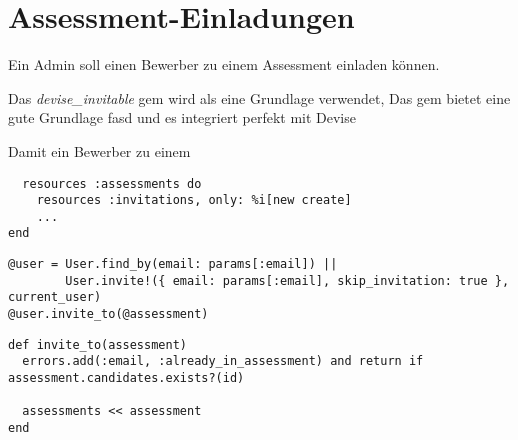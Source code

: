 \section{Assessment-Einladungen}

Ein Admin soll einen Bewerber zu einem Assessment einladen können.



Das \emph{devise\_invitable} gem wird als eine Grundlage verwendet, 
Das gem bietet eine gute Grundlage fasd und es integriert perfekt mit Devise


Damit ein Bewerber zu einem 

\begin{codebox}
\begin{verbatim}
  resources :assessments do
    resources :invitations, only: %i[new create]
    ...
end
\end{verbatim}
\end{codebox}

\begin{codebox}
\begin{verbatim}
@user = User.find_by(email: params[:email]) ||
        User.invite!({ email: params[:email], skip_invitation: true }, current_user)
@user.invite_to(@assessment)
\end{verbatim}
\end{codebox}


\begin{codebox}
\begin{verbatim}
def invite_to(assessment)
  errors.add(:email, :already_in_assessment) and return if assessment.candidates.exists?(id)
  
  assessments << assessment
end
\end{verbatim}
\end{codebox}
